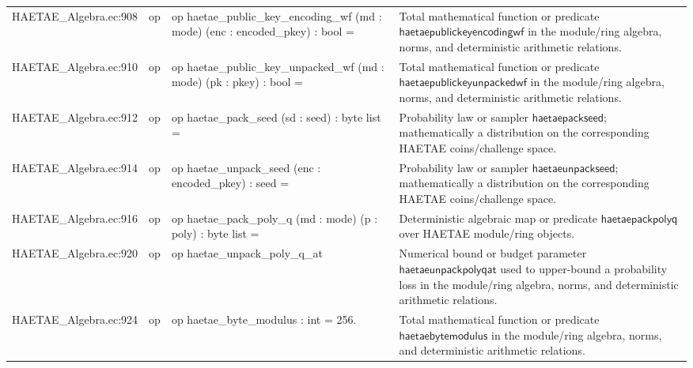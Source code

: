 \documentclass[10pt]{article}
\begin{document}
\begin{longtable}{L{0.11\textwidth}L{0.055\textwidth}L{0.385\textwidth}L{0.41\textwidth}}
HAETAE\_\allowbreak{}Algebra.\allowbreak{}ec:\allowbreak{}908 & op & {\ttfamily\scriptsize op haetae\_\allowbreak{}public\_\allowbreak{}key\_\allowbreak{}encoding\_\allowbreak{}wf (md : mode) (enc : encoded\_\allowbreak{}pkey) : bool =} & Total mathematical function or predicate $\mathsf{haetaepublickeyencodingwf}$ in the module/ring algebra, norms, and deterministic arithmetic relations. \\
HAETAE\_\allowbreak{}Algebra.\allowbreak{}ec:\allowbreak{}910 & op & {\ttfamily\scriptsize op haetae\_\allowbreak{}public\_\allowbreak{}key\_\allowbreak{}unpacked\_\allowbreak{}wf (md : mode) (pk : pkey) : bool =} & Total mathematical function or predicate $\mathsf{haetaepublickeyunpackedwf}$ in the module/ring algebra, norms, and deterministic arithmetic relations. \\
HAETAE\_\allowbreak{}Algebra.\allowbreak{}ec:\allowbreak{}912 & op & {\ttfamily\scriptsize op haetae\_\allowbreak{}pack\_\allowbreak{}seed (sd : seed) : byte list =} & Probability law or sampler $\mathsf{haetaepackseed}$; mathematically a distribution on the corresponding HAETAE coins/challenge space. \\
HAETAE\_\allowbreak{}Algebra.\allowbreak{}ec:\allowbreak{}914 & op & {\ttfamily\scriptsize op haetae\_\allowbreak{}unpack\_\allowbreak{}seed (enc : encoded\_\allowbreak{}pkey) : seed =} & Probability law or sampler $\mathsf{haetaeunpackseed}$; mathematically a distribution on the corresponding HAETAE coins/challenge space. \\
HAETAE\_\allowbreak{}Algebra.\allowbreak{}ec:\allowbreak{}916 & op & {\ttfamily\scriptsize op haetae\_\allowbreak{}pack\_\allowbreak{}poly\_\allowbreak{}q (md : mode) (p : poly) : byte list =} & Deterministic algebraic map or predicate $\mathsf{haetaepackpolyq}$ over HAETAE module/ring objects. \\
HAETAE\_\allowbreak{}Algebra.\allowbreak{}ec:\allowbreak{}920 & op & {\ttfamily\scriptsize op haetae\_\allowbreak{}unpack\_\allowbreak{}poly\_\allowbreak{}q\_\allowbreak{}at} & Numerical bound or budget parameter $\mathsf{haetaeunpackpolyqat}$ used to upper-bound a probability loss in the module/ring algebra, norms, and deterministic arithmetic relations. \\
HAETAE\_\allowbreak{}Algebra.\allowbreak{}ec:\allowbreak{}924 & op & {\ttfamily\scriptsize op haetae\_\allowbreak{}byte\_\allowbreak{}modulus : int = 256.} & Total mathematical function or predicate $\mathsf{haetaebytemodulus}$ in the module/ring algebra, norms, and deterministic arithmetic relations. \\

\end{longtable}
\end{document}
